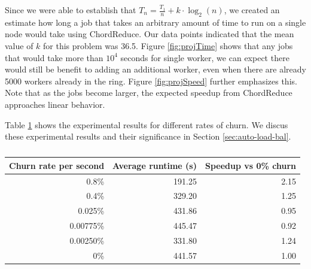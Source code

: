 Since we were able to establish that $T_{n} = \frac{T_{1}}{n} + k \cdot \log_{2}(n)$, we created an estimate how long a job that takes an arbitrary amount of time to run on a single node would take using ChordReduce.  
Our data points indicated that the mean value of $k$ for this problem was 36.5.  
Figure \ref{fig:projTime} shows that any jobs that would take more than $10^{4}$ seconds for single worker, we can expect there would still be benefit to adding an additional worker, even when there are already 5000 workers already in the ring.  
Figure \ref{fig:projSpeed} further emphasizes this. Note that as the jobs become larger, the expected speedup from ChordReduce  approaches linear behavior.


Table \ref{tab:churnSpeed} shows the experimental results for different rates of churn. 
We discus these experimental results and their significance in Section \ref{sec:auto-load-bal}.
\begin{table}
	\centering
	\begin{tabular}{|r|r|r|}
		\hline
		Churn rate per second & Average runtime (s) & Speedup vs 0\% churn\\ \hline{}
		0.8\% & 191.25 & 2.15 \\ \hline
		0.4\% & 329.20 & 1.25 \\ \hline
		0.025\% & 431.86 & 0.95 \\ \hline
		0.00775\%  & 445.47 & 0.92 \\ \hline
		0.00250\% & 331.80  &  1.24 \\ \hline
		0\% & 441.57 & 1.00 \\ \hline
	\end{tabular}
	\caption{}
	\label{tab:churnSpeed}
\end{table}






